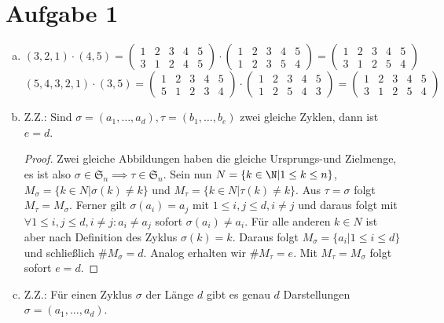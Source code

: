 \documentclass{article}
\begin{document}
	\section*{Aufgabe 1}
	\begin{enumerate}[a)]
		\item \[(3,2,1)\cdot(4,5) = \begin{pmatrix}1&2&3&4&5\\3&1&2&4&5\end{pmatrix}\cdot \begin{pmatrix}1&2&3&4&5\\1&2&3&5&4\end{pmatrix} = \begin{pmatrix}1&2&3&4&5\\3&1&2&5&4\end{pmatrix}\]
		\[(5,4,3,2,1)\cdot(3,5) = \begin{pmatrix}1&2&3&4&5\\5&1&2&3&4\end{pmatrix}\cdot \begin{pmatrix}1&2&3&4&5\\1&2&5&4&3\end{pmatrix} = \begin{pmatrix}1&2&3&4&5\\3&1&2&5&4\end{pmatrix}\]
		\item Z.Z.: Sind $\sigma = (a_1,\dots,a_d), \tau = (b_1,\dots,b_e)$ zwei gleiche Zyklen, dann ist $e=d$.\\
		\begin{proof} Zwei gleiche Abbildungen haben die gleiche Ursprungs-und Zielmenge, es ist also $\sigma \in \mathfrak{S}_n \implies \tau\in \mathfrak{S}_n$.
		Sein nun $N =  \{k\in \N|1 \leq k\leq n\}$,  $M_\sigma = \{k \in N|\sigma(k)\neq k\}$ und $M_\tau = \{k \in N|\tau(k)\neq k\}$.
		Aus $\tau = \sigma$ folgt $M_\tau = M_\sigma$.
		Ferner gilt $\sigma(a_i) = a_j$ mit $1\leq i, j\leq d, i\neq j$ und daraus folgt mit $\forall 1\leq i, j\leq d, i \neq j: a_i\neq a_j$ sofort $\sigma(a_i)\neq a_i$. Für alle anderen $k\in N$ ist aber nach Definition des Zyklus $\sigma(k) = k$. Daraus folgt $M_\sigma = \{a_i|1\leq i\leq d\}$ und schließlich $\# M_\sigma = d$. Analog erhalten wir $\# M_\tau = e$. Mit $M_\tau = M_\sigma$ folgt sofort $e = d$.\end{proof}
		\item Z.Z.: Für einen Zyklus $\sigma$ der Länge $d$ gibt es genau $d$ Darstellungen $\sigma = (a_1, \dots, a_d)$.\\

\end{enumerate}
\end{document}

